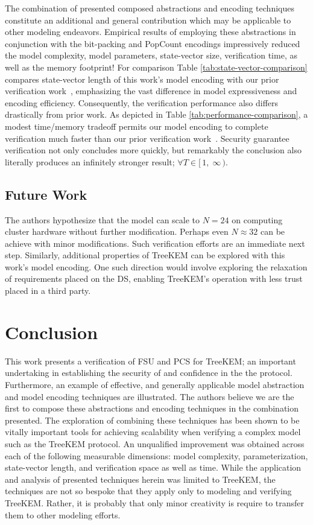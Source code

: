 \documentclass[runningheads]{llncs}
\newcommand{\Abrev}[1]{\gls{#1}}
\newcommand{\NumericRangeOpenR}[2]{\ensuremath{[\,#1,\; #2\,)}\xspace}
\begin{document}
The combination of presented composed abstractions and encoding techniques constitute an additional and general contribution which may be applicable to other modeling endeavors.
Empirical results of employing these abstractions in conjunction with the bit-packing and PopCount encodings impressively reduced the model complexity, model parameters, state-vector size, verification time, as well as the memory footprint!
For comparison Table \ref{tab:state-vector-comparison} compares state-vector length of this work's model encoding with our prior verification work~\cite{washburn2022formal}, emphasizing the vast difference in model expressiveness and encoding efficiency.
Consequently, the verification performance also differs drastically from prior work.
As depicted in Table \ref{tab:performance-comparison}, a modest time/memory tradeoff permits our model encoding to complete verification much faster than our prior verification work~\cite{washburn2022formal}.
Security guarantee verification not only concludes more quickly, but remarkably the conclusion also literally produces an infinitely stronger result; $\forall T \in \NumericRangeOpenR{1}{\infty}$.

\subsection{Future Work}

The authors hypothesize that the model can scale to $N = 24$ on computing cluster hardware without further modification.
Perhaps even $N \approx 32$ can be achieve with minor modifications.
Such verification efforts are an immediate next step.
Similarly, additional properties of TreeKEM can be explored with this work's model encoding.
One such direction would involve exploring the relaxation of requirements placed on the \Abrev{DS}, enabling TreeKEM's operation with less trust placed in a third party.
 
\section{Conclusion}

This work presents a verification of \Abrev{FSU} and \Abrev{PCS} for TreeKEM; an important undertaking in establishing the security of and confidence in the the protocol.
Furthermore, an example of effective, and generally applicable model abstraction and model encoding techniques are illustrated.
The authors believe we are the first to compose these abstractions and encoding techniques in the combination presented.
The exploration of combining these techniques has been shown to be vitally important tools for achieving scalability when verifying a complex model such as the TreeKEM protocol.
An unqualified improvement was obtained across each of the following measurable dimensions: model complexity,  parameterization, state-vector length, and verification space as well as time.
While the application and analysis of presented techniques herein was limited to TreeKEM, the techniques are not so bespoke that they apply only to modeling and verifying TreeKEM.
Rather, it is probably that only minor creativity is require to transfer them to other modeling efforts.
\end{document}
